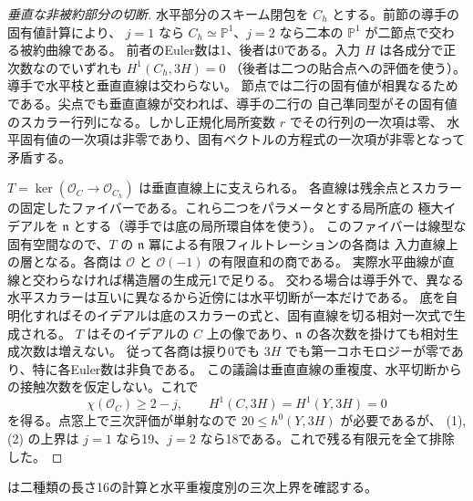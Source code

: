 \begin{proof}[垂直な非被約部分の切断]
水平部分のスキーム閉包を $C_h$ とする。前節の導手の固有値計算により、
$j=1$ なら $C_h\simeq\mathbb P^1$、$j=2$ なら二本の $\mathbb P^1$ が二節点で交わる被約曲線である。
前者のEuler数は1、後者は0である。入力 $H$ は各成分で正次数なのでいずれも $H^1(C_h,3H)=0$
（後者は二つの貼合点への評価を使う）。導手で水平枝と垂直直線は交わらない。
節点では二行の固有値が相異なるためである。尖点でも垂直直線が交われば、導手の二行の
自己準同型がその固有値のスカラー行列になる。しかし正規化局所変数 $r$ でその行列の一次項は零、
水平固有値の一次項は非零であり、固有ベクトルの方程式の一次項が非零となって矛盾する。

$T=\ker(\mathcal O_C\to\mathcal O_{C_h})$ は垂直直線上に支えられる。
各直線は残余点とスカラーの固定したファイバーである。これら二つをパラメータとする局所底の
極大イデアルを $\mathfrak n$ とする（導手では底の局所環自体を使う）。
このファイバーは線型な固有空間なので、$T$ の $\mathfrak n$ 冪による有限フィルトレーションの各商は
入力直線上の層となる。各商は $\mathcal O$ と $\mathcal O(-1)$ の有限直和の商である。
実際水平曲線が直線と交わらなければ構造層の生成元1で足りる。
交わる場合は導手外で、異なる水平スカラーは互いに異なるから近傍には水平切断が一本だけである。
底を自明化すればそのイデアルは底のスカラーの式と、固有直線を切る相対一次式で生成される。
$T$ はそのイデアルの $C$ 上の像であり、$\mathfrak n$ の各次数を掛けても相対生成次数は増えない。
従って各商は捩り0でも $3H$ でも第一コホモロジーが零であり、特に各Euler数は非負である。
この議論は垂直直線の重複度、水平切断からの接触次数を仮定しない。これで
\[
         \chi(\mathcal O_C)\ge2-j,\qquad H^1(C,3H)=H^1(Y,3H)=0
\]
を得る。点窓上で三次評価が単射なので $20\le h^0(Y,3H)$ が必要であるが、
(1),(2) の上界は $j=1$ なら19、$j=2$ なら18である。これで残る有限元を全て排除した。
\end{proof}

 は二種類の長さ16の計算と水平重複度別の三次上界を確認する。
